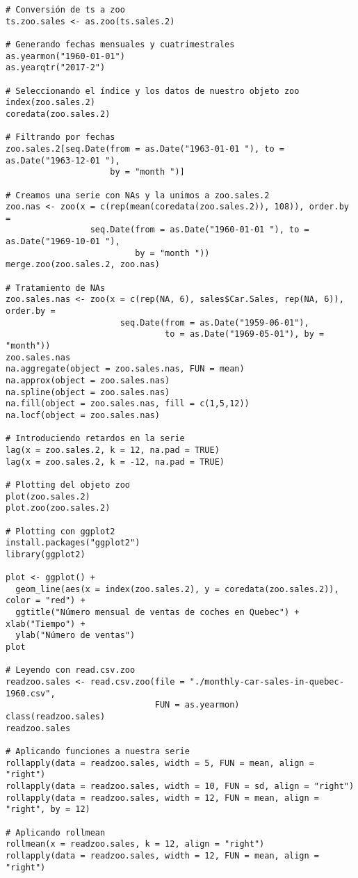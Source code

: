 \documentclass[12pt,a4paper,oneside]{article}
\begin{document}
\begin{Verbatim}[fontsize=\footnotesize]
# Conversión de ts a zoo
ts.zoo.sales <- as.zoo(ts.sales.2)

# Generando fechas mensuales y cuatrimestrales
as.yearmon("1960-01-01")
as.yearqtr("2017-2")

# Seleccionando el índice y los datos de nuestro objeto zoo
index(zoo.sales.2)
coredata(zoo.sales.2)

# Filtrando por fechas
zoo.sales.2[seq.Date(from = as.Date("1963-01-01 "), to = as.Date("1963-12-01 "),
                     by = "month ")]

# Creamos una serie con NAs y la unimos a zoo.sales.2
zoo.nas <- zoo(x = c(rep(mean(coredata(zoo.sales.2)), 108)), order.by =
                 seq.Date(from = as.Date("1960-01-01 "), to = as.Date("1969-10-01 "),
                          by = "month "))
merge.zoo(zoo.sales.2, zoo.nas)

# Tratamiento de NAs
zoo.sales.nas <- zoo(x = c(rep(NA, 6), sales$Car.Sales, rep(NA, 6)), order.by =
                       seq.Date(from = as.Date("1959-06-01"),
                                to = as.Date("1969-05-01"), by = "month"))
zoo.sales.nas
na.aggregate(object = zoo.sales.nas, FUN = mean)
na.approx(object = zoo.sales.nas)
na.spline(object = zoo.sales.nas)
na.fill(object = zoo.sales.nas, fill = c(1,5,12))
na.locf(object = zoo.sales.nas)

# Introduciendo retardos en la serie
lag(x = zoo.sales.2, k = 12, na.pad = TRUE)
lag(x = zoo.sales.2, k = -12, na.pad = TRUE)

# Plotting del objeto zoo
plot(zoo.sales.2)
plot.zoo(zoo.sales.2)

# Plotting con ggplot2
install.packages("ggplot2")
library(ggplot2)

plot <- ggplot() +
  geom_line(aes(x = index(zoo.sales.2), y = coredata(zoo.sales.2)), color = "red") +
  ggtitle("Número mensual de ventas de coches en Quebec") + xlab("Tiempo") +
  ylab("Número de ventas")
plot

# Leyendo con read.csv.zoo
readzoo.sales <- read.csv.zoo(file = "./monthly-car-sales-in-quebec-1960.csv",
                              FUN = as.yearmon)
class(readzoo.sales)
readzoo.sales

# Aplicando funciones a nuestra serie
rollapply(data = readzoo.sales, width = 5, FUN = mean, align = "right")
rollapply(data = readzoo.sales, width = 10, FUN = sd, align = "right")
rollapply(data = readzoo.sales, width = 12, FUN = mean, align = "right", by = 12)

# Aplicando rollmean
rollmean(x = readzoo.sales, k = 12, align = "right")
rollapply(data = readzoo.sales, width = 12, FUN = mean, align = "right")


\end{Verbatim}
\end{document}
